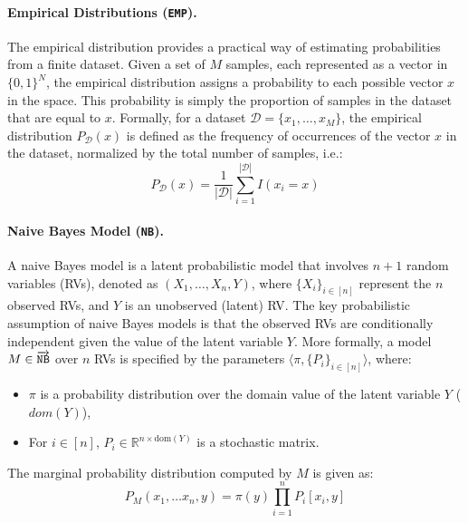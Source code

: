 


\paragraph{Empirical Distributions (\texttt{EMP}).} The empirical distribution provides a practical way of estimating probabilities from a finite dataset. Given a set of $M$ samples, each represented as a vector in $\{0,1\}^{N}$, the empirical distribution assigns a probability to each possible vector $x$ in the space. This probability is simply the proportion of samples in the dataset that are equal to $x$. Formally, for a dataset $\mathcal{D} = \{x_{1}, \ldots, x_{M}\}$, the empirical distribution $P_{\mathcal{D}}(x)$ is defined as the frequency of occurrences of the vector $x$ in the dataset, normalized by the total number of samples, i.e.:
$$P_{\mathcal{D}}(x) = \frac{1}{|\mathcal{D}|} \sum\limits_{i=1}^{|\mathcal{D}|}  I(x_{i} = x)$$

\paragraph{Naive Bayes Model (\texttt{NB}).} A naive Bayes model is a latent probabilistic model that involves $n+1$ random variables (RVs), denoted as $(X_{1}, \ldots , X_{n}, Y)$, where $\{X_{i}\}_{i \in [n]}$ represent the $n$ observed RVs, and $Y$ is an unobserved (latent) RV. The key probabilistic assumption of naive Bayes models is that the observed RVs are conditionally independent given the value of the latent variable $Y$. More formally, a model $M \in \overrightarrow{\texttt{NB}}$ over $n$ RVs is specified by the parameters $\langle\pi, \{P_{i}\}_{i \in [n]}\rangle$, where:

\begin{itemize}
    \item $\pi$ is a probability distribution over the domain value of the latent variable $Y$ ($dom(Y)$),
    \item For $i \in [n]$, $P_{i} \in \mathbb{R}^{n \times \text{dom}(Y)}$ is a stochastic matrix. 
\end{itemize}
The marginal probability distribution computed by $M$ is given as:
$$P_{M}(x_{1}, \ldots x_{n}, y) = \pi(y) \prod\limits_{i=1}^{n} P_{i}[x_{i}, y]$$

